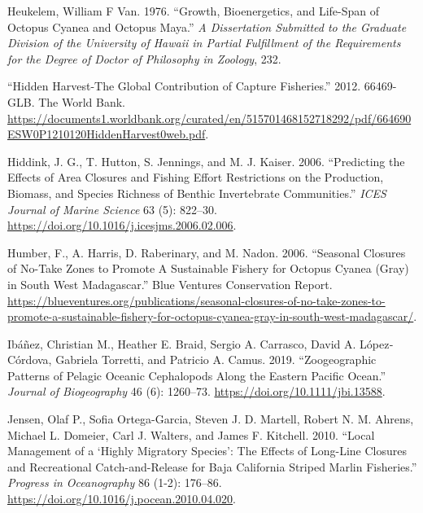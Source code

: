 \documentclass[
]{article}
\newlength{\cslhangindent}
\newlength{\cslentryspacingunit} %
\newenvironment{CSLReferences}[2] %
 {%
  \setlength{\parindent}{0pt}
  \ifodd #1
  \let\oldpar\par
  \def\par{\hangindent=\cslhangindent\oldpar}
  \fi
  \setlength{\parskip}{#2\cslentryspacingunit}
 }%
 {}
\begin{document}
\begin{CSLReferences}{1}{0}
\leavevmode{}%
Heukelem, William F Van. 1976. {``Growth, Bioenergetics, and Life-Span of {Octopus} Cyanea and {Octopus} Maya.''} \emph{A Dissertation Submitted to the Graduate Division of the University of Hawaii in Partial Fulfillment of the Requirements for the Degree of Doctor of Philosophy in Zoology}, 232.

\leavevmode{}%
{``Hidden {Harvest}-{The} {Global} {Contribution} of {Capture} {Fisheries}.''} 2012. 66469-GLB. The World Bank. \url{https://documents1.worldbank.org/curated/en/515701468152718292/pdf/664690ESW0P1210120HiddenHarvest0web.pdf}.

\leavevmode{}%
Hiddink, J. G., T. Hutton, S. Jennings, and M. J. Kaiser. 2006. {``Predicting the Effects of Area Closures and Fishing Effort Restrictions on the Production, Biomass, and Species Richness of Benthic Invertebrate Communities.''} \emph{ICES Journal of Marine Science} 63 (5): 822--30. \url{https://doi.org/10.1016/j.icesjms.2006.02.006}.

\leavevmode{}%
Humber, F., A. Harris, D. Raberinary, and M. Nadon. 2006. {``Seasonal {Closures} of {No}-{Take} {Zones} to Promote {A} {Sustainable} {Fishery} for {Octopus} {Cyanea} ({Gray}) in {South} {West} {Madagascar}.''} Blue Ventures Conservation Report. \url{https://blueventures.org/publications/seasonal-closures-of-no-take-zones-to-promote-a-sustainable-fishery-for-octopus-cyanea-gray-in-south-west-madagascar/}.

\leavevmode{}%
Ibáñez, Christian M., Heather E. Braid, Sergio A. Carrasco, David A. López‐Córdova, Gabriela Torretti, and Patricio A. Camus. 2019. {``Zoogeographic Patterns of Pelagic Oceanic Cephalopods Along the Eastern {Pacific} {Ocean}.''} \emph{Journal of Biogeography} 46 (6): 1260--73. \url{https://doi.org/10.1111/jbi.13588}.

\leavevmode{}%
Jensen, Olaf P., Sofia Ortega-Garcia, Steven J. D. Martell, Robert N. M. Ahrens, Michael L. Domeier, Carl J. Walters, and James F. Kitchell. 2010. {``Local Management of a {`Highly Migratory Species'}: {The} Effects of Long-Line Closures and Recreational Catch-and-Release for {Baja} {California} Striped Marlin Fisheries.''} \emph{Progress in Oceanography} 86 (1-2): 176--86. \url{https://doi.org/10.1016/j.pocean.2010.04.020}.


\end{CSLReferences}
\end{document}
